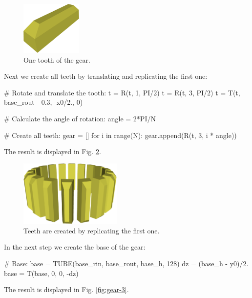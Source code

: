 \begin{figure}[!ht]
\begin{center}
\includegraphics[width=0.27\textwidth]{img/gear-1.png}
\end{center}
\vspace{-4mm}
\caption{One tooth of the gear.}
\label{fig:gear-1}
\end{figure}
\noindent
Next we create all teeth by translating and replicating the first one:

{\small
\begin{bluecode}
# Rotate and translate the tooth:
t = R(t, 1, PI/2)
t = R(t, 3, PI/2)
t = T(t, base_rout - 0.3, -x0/2., 0)

# Calculate the angle of rotation:
angle = 2*PI/N

# Create all teeth:
gear = []
for i in range(N):
    gear.append(R(t, 3, i * angle))
\end{bluecode}
}
\noindent
The result is displayed in Fig. \ref{fig:gear-2}.

\begin{figure}[!ht]
\begin{center}
\includegraphics[width=0.45\textwidth]{img/gear-2.png}
\end{center}
\vspace{-4mm}
\caption{Teeth are created by replicating the first one.}
\label{fig:gear-2}
\end{figure}
\noindent
In the next step we create the base of the gear:


{\small
\begin{bluecode}
# Base:
base = TUBE(base_rin, base_rout, base_h, 128)
dz = (base_h - y0)/2.
base = T(base, 0, 0, -dz)
\end{bluecode}
}
\newpage
\noindent
The result is displayed in Fig. \ref{fig:gear-3}.

